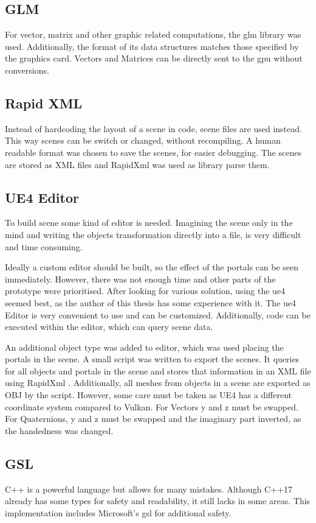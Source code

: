 \subsection{GLM}
For vector, matrix and other graphic related computations, the \gls{glm} library \cite{glm} was used. Additionally, the format of its data structures matches those specified by the graphics card. Vectors and Matrices can be directly sent to the \gls{gpu} without conversions.


\subsection{Rapid XML}
Instead of hardcoding the layout of a scene in code, scene files are used instead. This way scenes can be switch or changed, without recompiling. A human readable format was chosen to save the scenes, for easier debugging. The scenes are stored as XML files and RapidXml \cite{rapidxml} was used as library parse them.

\subsection{UE4 Editor}
To build scene some kind of editor is needed. Imagining the scene only in the mind and writing the objects transformation directly into a file, is very difficult and time consuming.

Ideally a custom editor should be built, so the effect of the portals can be seen immediately. However, there was not enough time and other parts of the prototype were prioritised. After looking for various solution, using the \gls{ue4} \cite{ue4} seemed best, as the author of this thesis has some experience with it. The \gls{ue4} Editor is very convenient to use and can be customized. Additionally, code can be executed within the editor, which can query scene data.

An additional object type was added to editor, which was used placing the portals in the scene. A small script was written to export the scenes. It queries for all objects and portals in the scene and stores that information in an XML file using RapidXml \cite{rapidxml}. Additionally, all meshes from objects in a scene are exported as OBJ by the script. However, some care must be taken as UE4 has a different coordinate system compared to Vulkan. For Vectors y and z must be swapped. For Quaternions, y and z must be swapped and the imaginary part inverted, as the handedness was changed.

\subsection{GSL}
C++ is a powerful language but allows for many mistakes. Although C++17 already has some types for safety and readability, it still lacks in some areas. This implementation includes Microsoft's \gls{gsl} \cite{microsoft:gsl} for additional safety.


